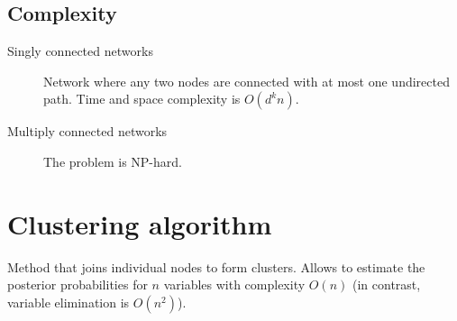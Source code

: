 \subsection{Complexity}
\begin{description}
    \item[Singly connected networks] 
        Network where any two nodes are connected with at most one undirected path.
        Time and space complexity is $O(d^k n)$.
    \item[Multiply connected networks] The problem is NP-hard.
\end{description}


\section{Clustering algorithm}

Method that joins individual nodes to form clusters.
Allows to estimate the posterior probabilities for $n$ variables with complexity $O(n)$ 
(in contrast, variable elimination is $O(n^2)$).